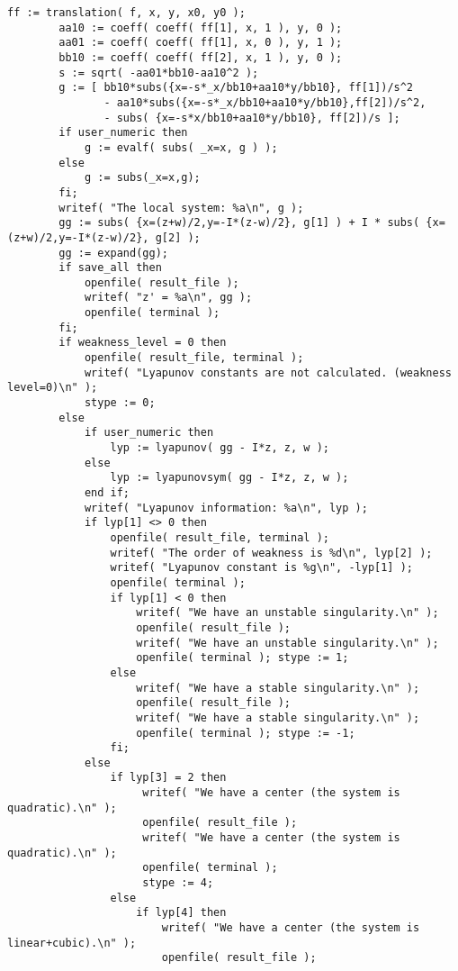 \documentclass[a4paper,10pt]{article}
\begin{document}
\begin{lstlisting}[name=weakfocus]
        ff := translation( f, x, y, x0, y0 );
        aa10 := coeff( coeff( ff[1], x, 1 ), y, 0 );
        aa01 := coeff( coeff( ff[1], x, 0 ), y, 1 );
        bb10 := coeff( coeff( ff[2], x, 1 ), y, 0 );
        s := sqrt( -aa01*bb10-aa10^2 );
        g := [ bb10*subs({x=-s*_x/bb10+aa10*y/bb10}, ff[1])/s^2
               - aa10*subs({x=-s*_x/bb10+aa10*y/bb10},ff[2])/s^2,
               - subs( {x=-s*x/bb10+aa10*y/bb10}, ff[2])/s ];
        if user_numeric then
            g := evalf( subs( _x=x, g ) );
        else
            g := subs(_x=x,g);
        fi;
        writef( "The local system: %a\n", g );
        gg := subs( {x=(z+w)/2,y=-I*(z-w)/2}, g[1] ) + I * subs( {x=(z+w)/2,y=-I*(z-w)/2}, g[2] );
        gg := expand(gg);
        if save_all then
            openfile( result_file );
            writef( "z' = %a\n", gg );
            openfile( terminal );
        fi;
        if weakness_level = 0 then
            openfile( result_file, terminal );
            writef( "Lyapunov constants are not calculated. (weakness level=0)\n" );
            stype := 0;
        else
            if user_numeric then
                lyp := lyapunov( gg - I*z, z, w );
            else
                lyp := lyapunovsym( gg - I*z, z, w );
            end if;
            writef( "Lyapunov information: %a\n", lyp );
            if lyp[1] <> 0 then
                openfile( result_file, terminal );
                writef( "The order of weakness is %d\n", lyp[2] );
                writef( "Lyapunov constant is %g\n", -lyp[1] );
                openfile( terminal );
                if lyp[1] < 0 then
                    writef( "We have an unstable singularity.\n" );
                    openfile( result_file );
                    writef( "We have an unstable singularity.\n" );
                    openfile( terminal ); stype := 1;
                else
                    writef( "We have a stable singularity.\n" );
                    openfile( result_file );
                    writef( "We have a stable singularity.\n" );
                    openfile( terminal ); stype := -1;
                fi;
            else
                if lyp[3] = 2 then
                     writef( "We have a center (the system is quadratic).\n" );
                     openfile( result_file );
                     writef( "We have a center (the system is quadratic).\n" );
                     openfile( terminal );
                     stype := 4;
                else
                    if lyp[4] then
                        writef( "We have a center (the system is linear+cubic).\n" );
                        openfile( result_file );

\end{lstlisting}
\end{document}
